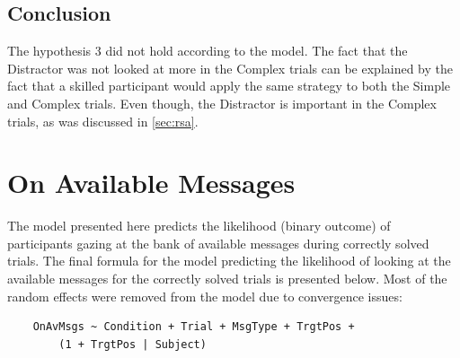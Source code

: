 \subsection*{Conclusion}
\label{sec:ondist_conclusion}
The hypothesis 3 did not hold according to the model. The fact that the Distractor was not looked at more in the Complex trials can be explained by the fact that a skilled participant would apply the same strategy to both the Simple and Complex trials. Even though, the Distractor is important in the Complex trials, as was discussed in \autoref{sec:rsa}.














\section{On Available Messages}
\label{sec:available_model}

The model presented here predicts the likelihood (binary outcome) of participants gazing at the bank of available messages during correctly solved trials. The final formula for the model predicting the likelihood of looking at the available messages for the correctly solved trials is presented below. Most of the random effects were removed from the model due to convergence issues:
\begin{verbatim}
    OnAvMsgs ~ Condition + Trial + MsgType + TrgtPos +
        (1 + TrgtPos | Subject)
\end{verbatim}

